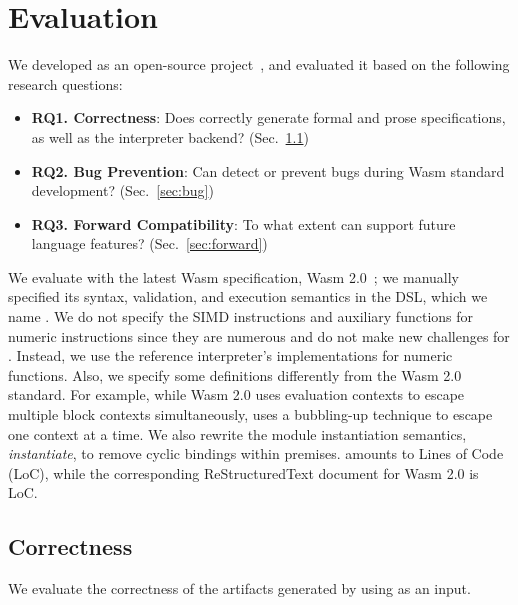 \section{Evaluation}
\label{sec:eval}
We developed \dslname as an open-source project~\cite{spectec}, and
evaluated it based on the following research questions:
\begin{itemize}
\item \textbf{RQ1. Correctness}:
Does \dslname correctly generate formal and prose specifications, as well as the interpreter backend?
(Sec.~\ref{sec:correctness})
\item \textbf{RQ2. Bug Prevention}:
Can \dslname detect or prevent bugs during Wasm standard development?
(Sec.~\ref{sec:bug})
\item \textbf{RQ3. Forward Compatibility}:
To what extent can \dslname support future language features?
(Sec.~\ref{sec:forward})
\end{itemize}

We evaluate \dslname with the latest Wasm specification, Wasm 2.0~\cite{wasmspec};
we manually specified its syntax, validation, and execution semantics
in the DSL, which we name \specdsl. We do not specify the SIMD
instructions and auxiliary functions for numeric instructions
since they are numerous and do not make new challenges for \dslname.
Instead, we use the reference interpreter's implementations for numeric functions.
Also, we specify some definitions differently from the Wasm 2.0 standard.
For example, while Wasm 2.0 uses evaluation contexts to escape multiple block contexts
simultaneously, \specdsl uses a bubbling-up technique to escape one context at a time.
We also rewrite the module instantiation semantics, \textit{instantiate},
to remove cyclic bindings within premises.
\specdsl amounts to  Lines of Code (LoC),
while the corresponding ReStructuredText document for Wasm 2.0 is
 LoC.

\subsection{Correctness}\label{sec:correctness}
We evaluate the correctness of the artifacts generated by \dslname using \specdsl as an input.

